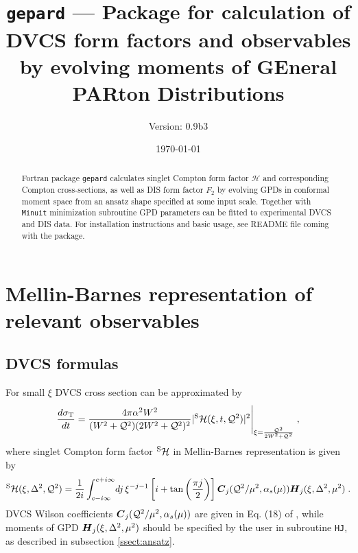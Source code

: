 \documentclass[12pt]{article}
\begin{document}
\title{\texttt{gepard} --- Package for calculation of DVCS form factors and observables
                            by evolving moments of GEneral PARton Distributions}
\author{Version: 0.9b3}
\date{\today}
\maketitle

\begin{abstract}
Fortran package \texttt{gepard} calculates singlet Compton form factor
$\mathcal{H}$ and corresponding Compton cross-sections, as well as
DIS form factor $F_2$ by evolving GPDs in conformal moment space from an ansatz shape
specified at some input scale.  Together
with \texttt{Minuit} minimization subroutine GPD parameters can be fitted to
experimental DVCS and DIS data. For installation instructions and
basic usage, see README file coming with the package.
\end{abstract}

\tableofcontents
\clearpage

\section{Mellin-Barnes representation of relevant observables}

\subsection{DVCS formulas}  

For small $\xi$ DVCS cross section can be approximated by 
\begin{equation}
\frac{d \sigma_{\rm T}}{d t} = \frac{4 \pi \alpha^2 W^2}{(W^2 + \mathcal{Q}^2)
(2 W^2 + \mathcal{Q}^2)^2} | ^{\rm S}\mathcal{H}(\xi, t, \mathcal{Q}^2)|^2 \Bigg|_{\xi
= \frac{\mathcal{Q}^2}{2 W^2 + \mathcal{Q}^2}} \;,
\label{eq:parsigma}
\end{equation}
where singlet Compton form factor $^{\rm S}\mathcal{H}$ in Mellin-Barnes representation is given by
\begin{equation}
{^{\rm S}{\cal H}}(\xi,\Delta^2,{\cal Q}^2)
= \frac{1}{2i}\int_{c-i \infty}^{c+ i \infty}\!
dj\,\xi^{-j-1} \left[i + \tan \left(\frac{\pi j}{2}\right) \right]
\mbox{\boldmath $C$}_{j}({\cal Q}^2/\mu^2,\alpha_s(\mu)) 
\mbox{\boldmath $H$}_{j} (\xi,\Delta^2,\mu^2) \;.
\label{eq:CFF}
\end{equation}
DVCS Wilson coefficients $\mbox{\boldmath $C$}_{j}({\cal Q}^2/\mu^2,\alpha_s(\mu))$
are given in Eq. (18) of \cite{Kumericki:2006xx}, while moments of
GPD $\mbox{\boldmath $H$}_{j} (\xi,\Delta^2,\mu^2)$ should be specified
by the user in subroutine \texttt{HJ}, as described in subsection \ref{ssect:ansatz}.
\end{document}
